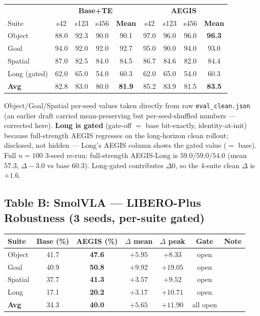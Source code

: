 \documentclass[11pt,a4paper]{article}
\newcommand{\win}[1]{{\color{frozengreen}\textbf{#1}}}
\begin{document}
\begin{table}[H]
\centering
\small
\begin{tabular}{lcccc|cccc}
\toprule
& \multicolumn{4}{c|}{\textbf{Base+TE}} & \multicolumn{4}{c}{\textbf{AEGIS}} \\
Suite & s42 & s123 & s456 & \textbf{Mean} & s42 & s123 & s456 & \textbf{Mean} \\
\midrule
Object  & 88.0 & 92.3 & 90.0 & 90.1 & 97.0 & 96.0 & 96.0 & \win{96.3} \\
Goal    & 94.0 & 92.0 & 92.0 & 92.7 & 95.0 & 90.0 & 94.0 & 93.0 \\
Spatial & 87.0 & 82.5 & 84.0 & 84.5 & 86.7 & 84.6 & 82.0 & 84.4 \\
Long (gated) & 62.0 & 65.0 & 54.0 & 60.3 & 62.0 & 65.0 & 54.0 & 60.3 \\
\midrule
\textbf{Avg} & 82.8 & 83.0 & 80.0 & \textbf{81.9} & 85.2 & 83.9 & 81.5 & \win{\textbf{83.5}} \\
\bottomrule
\end{tabular}
\end{table}
{\small Object/Goal/Spatial per-seed values taken directly from raw \texttt{eval\_clean.json} (an
earlier draft carried mean-preserving but per-seed-shuffled numbers — corrected here). \textbf{Long
is gated} (gate-off $=$ base bit-exactly, identity-at-init) because full-strength AEGIS regresses
on the long-horizon clean rollout; disclosed, not hidden — Long's AEGIS column shows the gated
value ($=$ base). Full $n=100$ 3-seed re-run: full-strength AEGIS-Long is $59.0/59.0/54.0$
(mean $57.3$, $\Delta -3.0$ vs base $60.3$). Long-gated contributes $\Delta 0$, so the 4-suite
clean $\Delta$ is $+1.6$.}

\subsection*{Table B: SmolVLA — LIBERO-Plus Robustness (3 seeds, per-suite gated)}

\begin{table}[H]
\centering
\small
\begin{tabular}{lcc|cc|cc}
\toprule
Suite & Base (\%) & AEGIS (\%) & $\Delta$ mean & $\Delta$ peak & Gate & Note \\
\midrule
Object  & 41.7 & \win{47.6} & $+5.95$ & $+8.33$  & open & \\
Goal    & 40.9 & \win{50.8} & $+9.92$ & $+19.05$ & open & \\
Spatial & 37.7 & \win{41.3} & $+3.57$ & $+9.52$  & open & \\
Long    & 17.1 & \win{20.2} & $+3.17$ & $+10.71$ & open & \\
\midrule
\textbf{Avg} & 34.3 & \win{40.0} & $+5.65$ & $+11.90$ & all open & \\
\bottomrule
\end{tabular}
\end{table}
\end{document}
